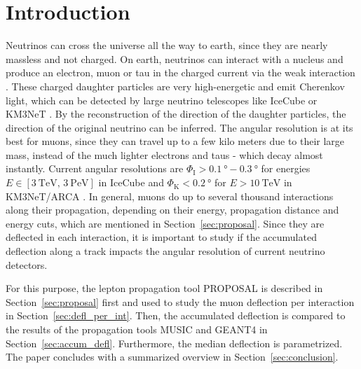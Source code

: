 \documentclass[pdflatex, sn-mathphys]{sn-jnl}%
\theoremstyle{thmstyleone}%
\theoremstyle{thmstyletwo}%
\theoremstyle{thmstylethree}%
\begin{document}



\maketitle

\section{Introduction}\label{sec:introduction}

Neutrinos can cross the universe all the way to earth, since they are 
nearly massless and not charged. On earth, neutrinos can interact 
with a nucleus and produce an electron, muon or tau in the charged current 
via the weak interaction \cite{pdg}. These charged daughter particles are very 
high-energetic and emit Cherenkov light, which can be detected 
by large neutrino telescopes like IceCube \cite{IceCube_Instrumentation} or 
KM3NeT \cite{KM3NeT_Design}. 
By the reconstruction of the direction of the daughter particles, the direction 
of the original neutrino can be inferred. The angular resolution is at its 
best for muons, since they can travel up to a few kilo meters due to their 
large mass, instead of the much lighter electrons and taus - which decay almost 
instantly. Current angular resolutions are 
$\Phi_{\text{I}} > \SI{0.1}{\degree} - \SI{0.3}{\degree}$ for energies 
$E \in [\SI{3}{\tera\electronvolt},\,\SI{3}{\peta\electronvolt}]$ in IceCube 
\cite{IceCube_Resolution2021} 
and 
$\Phi_{\text{K}} < \SI{0.2}{\degree}$ for $E > \SI{10}{\tera\electronvolt}$ in 
KM3NeT/ARCA \cite{KM3NeT_Resolution2021}.
In general, muons do up to several thousand interactions along their propagation, depending 
on their energy, propagation distance and energy cuts, which are mentioned in 
Section~\ref{sec:proposal}.
Since they 
are deflected in each interaction, it is important to study if the accumulated 
deflection along a track impacts the angular resolution of current 
neutrino detectors. 

For this purpose, the lepton propagation 
tool PROPOSAL \cite{koehne2013proposal, dunsch_2018_proposal_improvements} is described in Section~\ref{sec:proposal} first and used to study the muon deflection per interaction in 
Section~\ref{sec:defl_per_int}. Then, the
accumulated deflection is compared to the results of the propagation tools MUSIC and GEANT4 in Section~\ref{sec:accum_defl}. Furthermore, the median deflection is parametrized. The 
paper concludes with a summarized overview in Section~\ref{sec:conclusion}.
\end{document}
